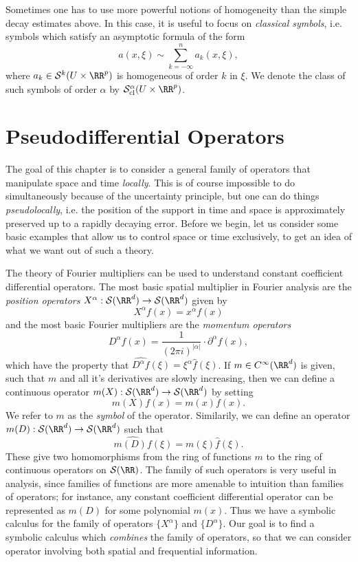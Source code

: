 Sometimes one has to use more powerful notions of homogeneity than the simple decay estimates above. In this case, it is useful to focus on \emph{classical symbols}, i.e. symbols which satisfy an asymptotic formula of the form
%
\[ a(x,\xi) \sim \sum_{k = -\infty}^n a_k(x,\xi), \]
%
where $a_k \in \mathcal{S}^k(U \times \RR^p)$ is homogeneous of order $k$ in $\xi$. We denote the class of such symbols of order $\alpha$ by $\mathcal{S}^\alpha_{\text{cl}}(U \times \RR^p)$.












\chapter{Pseudodifferential Operators}

The goal of this chapter is to consider a general family of operators that manipulate space and time \emph{locally}. This is of course impossible to do simultaneously because of the uncertainty principle, but one can do things \emph{pseudolocally}, i.e. the position of the support in time and space is approximately preserved up to a rapidly decaying error. Before we begin, let us consider some basic examples that allow us to control space or time exclusively, to get an idea of what we want out of such a theory.

The theory of Fourier multipliers can be used to understand constant coefficient differential operators. The most basic spatial multiplier in Fourier analysis are the \emph{position operators} $X^\alpha: \mathcal{S}(\RR^d) \to \mathcal{S}(\RR^d)$ given by
%
\[ X^\alpha f(x) = x^\alpha f(x) \]
%
and the most basic Fourier multipliers are the \emph{momentum operators}
%
\[ D^\alpha f(x) = \frac{1}{(2\pi i)^{|\alpha|}} \cdot \partial^\alpha f(x), \]
%
which have the property that $\widehat{D^\alpha f}(\xi) = \xi^\alpha \widehat{f}(\xi)$. If $m \in C^\infty(\RR^d)$ is given, such that $m$ and all it's derivatives are slowly increasing, then we can define a continuous operator $m(X): \mathcal{S}(\RR^d) \to \mathcal{S}(\RR^d)$ by setting
%
\[ m(X) f(x) = m(x) f(x). \]
%
We refer to $m$ as the \emph{symbol} of the operator. Similarily, we can define an operator $m(D): \mathcal{S}(\RR^d) \to \mathcal{S}(\RR^d)$ such that
%
\[ \widehat{m(D) f}(\xi) = m(\xi) \widehat{f}(\xi). \]
%
These give two homomorphisms from the ring of functions $m$ to the ring of continuous operators on $\mathcal{S}(\RR)$. The family of such operators is very useful in analysis, since families of functions are more amenable to intuition than families of operators; for instance, any constant coefficient differential operator can be represented as $m(D)$ for some polynomial $m(x)$. Thus we have a symbolic calculus for the family of operators $\{ X^\alpha \}$ and $\{ D^\alpha \}$. Our goal is to find a symbolic calculus which \emph{combines} the family of operators, so that we can consider operator involving both spatial and frequential information.

